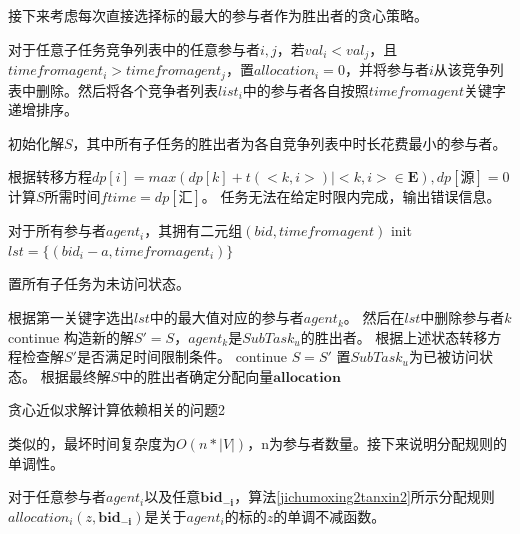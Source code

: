 \documentclass[promaster]{thesis-uestc}
\begin{document}
接下来考虑每次直接选择标的最大的参与者作为胜出者的贪心策略。
\begin{algorithm}[p]
    对于任意子任务竞争列表中的任意参与者$i,j$，若$val_i < val_j$，且$timefromagent_i > timefromagent_j$，置$allocation_i = 0$，并将参与者$i$从该竞争列表中删除。然后将各个竞争者列表$list_i$中的参与者各自按照$timefromagent$关键字递增排序。\;

    初始化解$S$，其中所有子任务的胜出者为各自竞争列表中时长花费最小的参与者。\;
    
    根据转移方程$dp[i] = max(dp[k]+t(<k,i>)|<k,i> \in \mathbf{E}),dp[\text{源}] = 0$计算$S$所需时间$ftime = dp[\text{汇}]$。\;
    {
        任务无法在给定时限内完成，输出错误信息。\;
    }

    对于所有参与者$agent_i$，其拥有二元组$(bid,timefromagent)$\;
    init $lst =\{(bid_i-a,timefromagent_i)\}$\;

    置所有子任务为未访问状态。\;

    {
        根据第一关键字选出$lst$中的最大值对应的参与者$agent_k$。\;
        然后在$lst$中删除参与者$k$\;
        {
            continue\;
        }
        构造新的解$S' = S$，$agent_k$是$SubTask_u$的胜出者。\;
        根据上述状态转移方程检查解$S'$是否满足时间限制条件。\;
        {
            continue\;
        }
        $S=S'$\;
        置$SubTask_u$为已被访问状态。\;
    }
    根据最终解$S$中的胜出者确定分配向量$\mathbf{allocation}$\;
\caption{贪心近似求解计算依赖相关的问题2}
\label{jichumoxing2tanxin2}
\end{algorithm}
类似的，最坏时间复杂度为$O(n*|V|)$，n为参与者数量。接下来说明分配规则的单调性。

\begin{theorem}
对于任意参与者$agent_i$以及任意$\mathbf{bid_{-i}}$，算法\ref{jichumoxing2tanxin2}所示分配规则$allocation_i(z,\mathbf{bid_{-i}})$是关于$agent_i$的标的$z$的单调不减函数。
\end{theorem}
\end{document}
